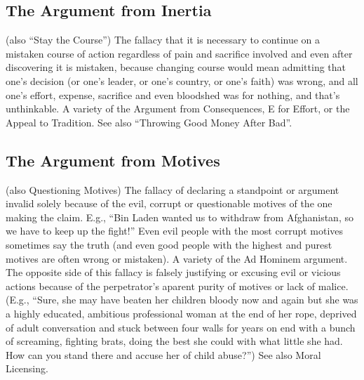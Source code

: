 \documentclass[10pt,a4paper,british]{article}
\begin{document}
\begin{multicols}{2}
    \subsection{The Argument from Inertia} (also “Stay the Course”) The fallacy
    that it is necessary to continue on a mistaken course of action regardless
    of pain and sacrifice involved  and even after discovering it is mistaken,
    because changing course would mean admitting that one's decision (or one's
    leader, or one's country, or one's faith) was wrong, and all one's effort,
    expense, sacrifice and even bloodshed was for nothing, and that's
    unthinkable. A variety of the Argument from Consequences, E for Effort, or
    the Appeal to Tradition. See also ``Throwing Good Money After Bad''.

	\subsection{The Argument from Motives} (also Questioning Motives) The
	fallacy of declaring a standpoint or argument invalid solely because of the
	evil, corrupt or questionable motives of the one making the claim. E.g.,
	``Bin Laden wanted us to withdraw from Afghanistan, so we have to keep up
	the fight!'' Even evil people with the most corrupt motives sometimes say
	the truth (and even good people with the highest and purest motives are
	often wrong or mistaken). A variety of the Ad Hominem argument. The
	opposite side of this fallacy is falsely justifying or excusing evil or
	vicious actions because of the perpetrator's aparent purity of motives or
	lack of malice.  (E.g., ``Sure, she may have beaten her children bloody now
	and again but she was a highly educated, ambitious professional woman at
	the end of her rope, deprived of adult conversation and stuck between four
	walls for years on end with a bunch of screaming, fighting brats, doing the
	best she could with what little she had. How can you stand there and accuse
	her of child abuse?'') See also Moral Licensing.


\end{multicols}
\end{document}
